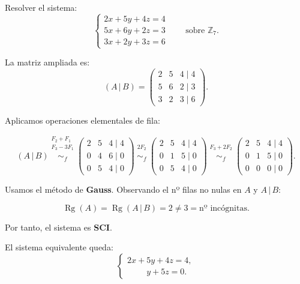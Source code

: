 \documentclass[a4paper,12pt]{article}
\begin{document}
\begin{ejemplo}[title=Resolución de un sistema lineal sobre $\mathbb{Z}_7$]
Resolver el sistema:
\[
\begin{cases}
2x + 5y + 4z = 4 \\
5x + 6y + 2z = 3 \\
3x + 2y + 3z = 6 
\end{cases}
\qquad \text{sobre } \mathbb{Z}_7.
\]

La matriz ampliada es:
\[
(A\,|\,B)=
\begin{pmatrix}
2 & 5 & 4 \;\Big|\; 4 \\
5 & 6 & 2 \;\Big|\; 3 \\
3 & 2 & 3 \;\Big|\; 6
\end{pmatrix}.
\]

Aplicamos operaciones elementales de fila:

\[
(A\,|\,B)
\overset{\substack{F_2 + F_1 \\ F_3 - 3F_1 \\{}}}{\sim_f}
\begin{pmatrix}
2 & 5 & 4 \;\Big|\; 4 \\
0 & 4 & 6 \;\Big|\; 0 \\
0 & 5 & 4 \;\Big|\; 0
\end{pmatrix}
\overset{\substack{2F_2 \\{}}}{\sim_f}
\begin{pmatrix}
2 & 5 & 4 \;\Big|\; 4 \\
0 & 1 & 5 \;\Big|\; 0 \\
0 & 5 & 4 \;\Big|\; 0
\end{pmatrix}
\overset{\substack{F_3 + 2F_2 \\{}}}{\sim_f}
\begin{pmatrix}
2 & 5 & 4 \;\Big|\; 4 \\
0 & 1 & 5 \;\Big|\; 0 \\
0 & 0 & 0 \;\Big|\; 0
\end{pmatrix}.
\]

\vspace{0.5em}

Usamos el método de \textbf{Gauss}. Observando el nº filas no nulas en $A$ y $A\,|\,B$:

\[
\operatorname{Rg}(A)=\operatorname{Rg}(A\,|\,B)=2 \neq 3 = \text{nº incógnitas}.
\]

Por tanto, el sistema es \textbf{SCI}.

\bigskip

El sistema equivalente queda:
\[
\begin{cases}
2x + 5y + 4z = 4,\\[2mm]
\phantom{2x +{}} y + 5z = 0.
\end{cases}
\]


\end{ejemplo}
\end{document}

